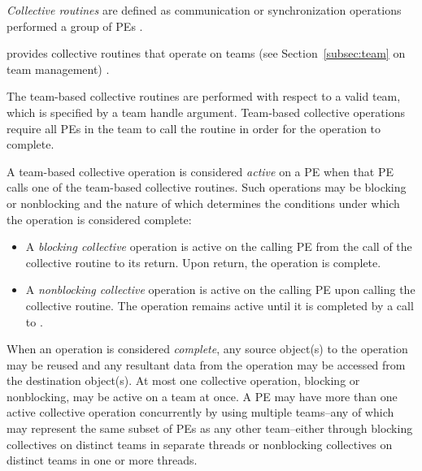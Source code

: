 \emph{Collective routines} are defined as  communication or
synchronization operations performed   a group of \acp{PE} .
{\color{ForestGreen} %
\openshmem provides collective routines that operate on teams
(see Section~\ref{subsec:team} on team management)
.

The team-based collective routines are performed with respect to a valid
\openshmem team, which is specified by a team handle argument.
Team-based collective operations require all \acp{PE} in the team to call
the routine in order for the operation to complete.

A team-based collective operation is considered \emph{active} on a \ac{PE}
when that \ac{PE} calls one of the team-based collective routines.
Such operations may be blocking or nonblocking and the nature of which
determines the conditions under which the operation is considered complete:

\begin{itemize}
\item A \emph{blocking collective} operation is active on the calling \ac{PE}
  from the call of the collective routine to its return.
  Upon return, the operation is complete.
\item A \emph{nonblocking collective} operation is active on the calling
  \ac{PE} upon calling the collective routine.
  The operation remains active until it is completed by a call to
  .
\end{itemize}

When an operation is considered \emph{complete}, any source object(s) to the
operation may be reused and any resultant data from the operation may be
accessed from the destination object(s).
At most one collective operation, blocking or nonblocking, may be active
on a team at once.
A \ac{PE} may have more than one active collective operation concurrently by
using multiple teams--any of which may represent the same subset of \acp{PE}
as any other team--either through blocking collectives on distinct teams
in separate threads or nonblocking collectives on distinct teams in one or
more threads.
} %

